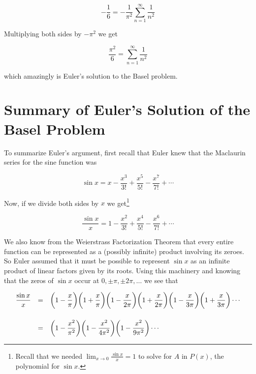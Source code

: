 \documentclass[11pt, oneside]{article}   	%
\begin{document}
\begin{equation*}
- \dfrac{1}{6} = - \dfrac{1}{\pi^2} \sum\limits_{n=1}^\infty \dfrac{1}{n^2}
\end{equation*}

\bigskip
\noindent
Multiplying both sides by $- \pi^2$ we get

\begin{equation*}
\dfrac{\pi^2}{6} = \sum\limits_{n=1}^\infty \dfrac{1}{n^2}
\end{equation*}

\bigskip
\noindent
which amazingly is Euler's solution to the Basel problem. 


\section{Summary of Euler's Solution of the Basel Problem}
To summarize Euler's argument, first recall that Euler knew that
the Maclaurin series for the sine function was

\bigskip
\begin{equation*}
\sin x = x - \frac{x^3}{3!} + \frac{x^5}{5!} - \frac{x^7}{7!} + \cdots
\end{equation*}

\bigskip
\noindent
Now, if we divide both sides by $x$ we get\footnote{Recall that
we needed ${\displaystyle \lim_{x \to 0}} \frac{\sin x}{x} = 1$
to solve for $A$ in $P(x)$, the polynomial for $\sin x$.}

\bigskip
\begin{equation*}
\frac{\sin x }{x}= 1 - \frac{x^2}{3!} + \frac{x^4}{5!} - \frac{x^6}{7!} + \cdots
\end{equation*}


\bigskip
\noindent
We also know from the Weierstrass Factorization Theorem
\cite{wiki:weierstrass} that every entire function
\cite{wiki:entire_function} can be represented as a (possibly
infinite) product involving its zeroes. So Euler assumed that it
must be possible to represent $\sin x$ as an infinite product of
linear factors given by its roots. Using this machinery and
knowing that the zeros of $\sin x$ occur at $0, \pm \pi, \pm
2\pi, \hdots$ we see that

\begin{equation*}
\begin{array}{lllll}
\mathlarger{\frac{\sin x }{x}}
&=& \mathlarger{ \bigg (1 - \frac{x}{\pi} \bigg ) \bigg (1 + \frac{x}{\pi} \bigg )
                             \bigg (1 - \frac{x}{2\pi} \bigg ) \bigg (1 + \frac{x}{2 \pi} \bigg )
                             \bigg (1 - \frac{x}{3\pi} \bigg ) \bigg (1 + \frac{x}{3 \pi} \bigg )
                             \cdots} \\
[22pt]
&=& \mathlarger{ \bigg (1 - \frac{x^2}{\pi^2} \bigg ) 
                            \bigg (1 - \frac{x^2}{4 \pi^2} \bigg ) 
                            \bigg (1 - \frac{x^2}{9 \pi^2} \bigg ) 
                            \cdots}
 \end{array}
\end{equation*}
\end{document}
